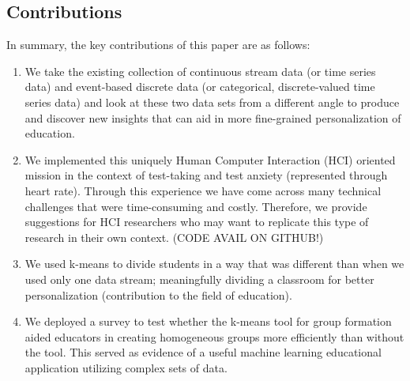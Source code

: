 \subsection{Contributions}
In summary, the key contributions of this paper are as follows:

\begin{enumerate}
    \item We take the existing collection of continuous stream data (or time series data) and event-based discrete data (or categorical, discrete-valued time series data) and look at these two data sets from a different angle to produce and discover new insights that can aid in more fine-grained personalization of education.
    \item We implemented this uniquely Human Computer Interaction (HCI) oriented mission in the context of test-taking and test anxiety (represented through heart rate). Through this experience we have come across many technical challenges that were time-consuming and costly. Therefore, we provide suggestions for HCI researchers who may want to replicate this type of research in their own context. (CODE AVAIL ON GITHUB!)
    \item We used k-means to divide students in a way that was different than when we used only one data stream; meaningfully dividing a classroom for better personalization (contribution to the field of education).
    \item We deployed a survey to test whether the k-means tool for group formation aided educators in creating homogeneous groups more efficiently than without the tool. This served as evidence of a useful machine learning educational application utilizing complex sets of data.    
\end{enumerate}


 
